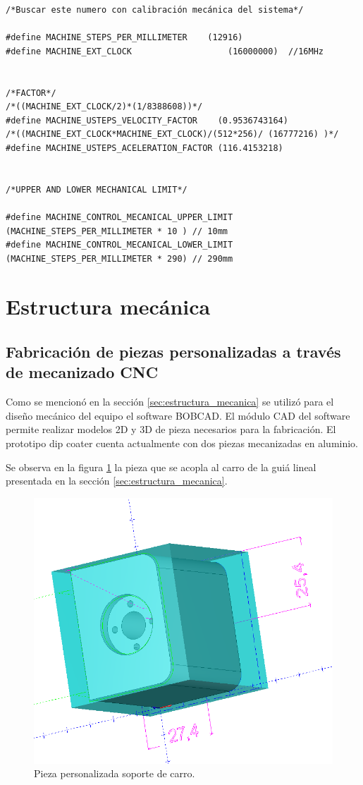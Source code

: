 \begin{lstlisting}[label=cod:vControl,caption=Macros para configurar de desplazamientos.]  % Start your code-block
/*Buscar este numero con calibración mecánica del sistema*/

#define MACHINE_STEPS_PER_MILLIMETER	(12916)		
#define MACHINE_EXT_CLOCK					(16000000)	//16MHz


/*FACTOR*/
/*((MACHINE_EXT_CLOCK/2)*(1/8388608))*/	
#define MACHINE_USTEPS_VELOCITY_FACTOR	  (0.9536743164)
/*((MACHINE_EXT_CLOCK*MACHINE_EXT_CLOCK)/(512*256)/ (16777216) )*/
#define MACHINE_USTEPS_ACELERATION_FACTOR (116.4153218)


/*UPPER AND LOWER MECHANICAL LIMIT*/

#define MACHINE_CONTROL_MECANICAL_UPPER_LIMIT 	(MACHINE_STEPS_PER_MILLIMETER * 10 ) // 10mm
#define MACHINE_CONTROL_MECANICAL_LOWER_LIMIT	(MACHINE_STEPS_PER_MILLIMETER * 290) // 290mm

\end{lstlisting}







\section{Estructura mecánica}
\subsection{Fabricación de piezas personalizadas a través de mecanizado CNC}

Como se mencionó en la sección \ref{sec:estructura_mecanica} se utilizó para el diseño mecánico del equipo el software BOBCAD. El módulo CAD del software permite realizar modelos 2D y 3D de pieza necesarios para la fabricación.
El prototipo dip coater cuenta actualmente con dos piezas mecanizadas en aluminio.
 
Se observa en la figura \ref{fig:carro} la pieza que se acopla al carro de la guiá lineal presentada en la sección \ref{sec:estructura_mecanica}.

\begin{figure}[ht]
	\centering
	\includegraphics[width=.5\textwidth]{./Figures/3d_carro.png}
	\caption{Pieza personalizada soporte de carro.}
	\label{fig:carro}
\end{figure}

